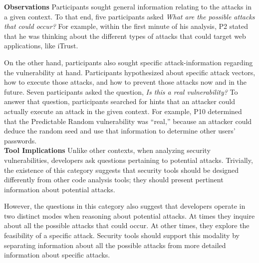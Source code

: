 \documentclass[conference]{IEEEtran}
\begin{document}
\noindent\textbf{Observations}
Participants sought general information relating to the attacks in a given context.
To that end, five participants asked \textit{What are the possible attacks that could occur?}
For example, within the first minute of his analysis, P2 stated that he was thinking about the different types of attacks that could target web applications, like iTrust.

On the other hand, participants also sought specific attack-information regarding the vulnerability at hand.
Participants hypothesized about specific attack vectors, how to execute those attacks, and how to prevent those attacks now and in the future.
Seven participants asked the question, \textit{Is this a real vulnerability?} To answer that question, participants searched for hints that an attacker could actually execute an attack in the given context. For example, P10 determined that the Predictable Random vulnerability was ``real,'' because an attacker could deduce the random seed and use that information to determine other users' passwords. 
\\

\noindent\textbf{Tool Implications}
Unlike other contexts, when analyzing security vulnerabilities, developers ask questions pertaining to potential attacks.
Trivially, the existence of this category suggests that security tools should be designed differently from other code analysis tools; they should present pertinent information about potential attacks.

However, the questions in this category also suggest that developers operate in two distinct modes when reasoning about potential attacks.
At times they inquire about all the possible attacks that could occur.
At other times, they explore the feasibility of a specific attack.
Security tools should support this modality by separating information about all the possible attacks from more detailed information about specific attacks.

\end{document}
